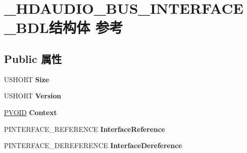 \hypertarget{struct___h_d_a_u_d_i_o___b_u_s___i_n_t_e_r_f_a_c_e___b_d_l}{}\section{\+\_\+\+H\+D\+A\+U\+D\+I\+O\+\_\+\+B\+U\+S\+\_\+\+I\+N\+T\+E\+R\+F\+A\+C\+E\+\_\+\+B\+D\+L结构体 参考}
\label{struct___h_d_a_u_d_i_o___b_u_s___i_n_t_e_r_f_a_c_e___b_d_l}
\subsection*{Public 属性}
\begin{DoxyCompactItemize}
\item 
\mbox{\label{struct___h_d_a_u_d_i_o___b_u_s___i_n_t_e_r_f_a_c_e___b_d_l_a1f72cb5ee8ed0588aee8e1c1cab9c82c}} 
U\+S\+H\+O\+RT {\bfseries Size}
\item 
\mbox{\label{struct___h_d_a_u_d_i_o___b_u_s___i_n_t_e_r_f_a_c_e___b_d_l_ac65043cf27b781c04b795db78a9beda2}} 
U\+S\+H\+O\+RT {\bfseries Version}
\item 
\mbox{\label{struct___h_d_a_u_d_i_o___b_u_s___i_n_t_e_r_f_a_c_e___b_d_l_a94973f2d2142e6372eb134040fd49f6a}} 
\hyperlink{interfacevoid}{P\+V\+O\+ID} {\bfseries Context}
\item 
\mbox{\label{struct___h_d_a_u_d_i_o___b_u_s___i_n_t_e_r_f_a_c_e___b_d_l_a110b7573dc3fa08666baddff612449d9}} 
P\+I\+N\+T\+E\+R\+F\+A\+C\+E\+\_\+\+R\+E\+F\+E\+R\+E\+N\+CE {\bfseries Interface\+Reference}
\item 
\mbox{\label{struct___h_d_a_u_d_i_o___b_u_s___i_n_t_e_r_f_a_c_e___b_d_l_a1e91f3c54a6514fac028672e6ccdba01}} 
P\+I\+N\+T\+E\+R\+F\+A\+C\+E\+\_\+\+D\+E\+R\+E\+F\+E\+R\+E\+N\+CE {\bfseries Interface\+Dereference}
\item 
\mbox{\label{struct___h_d_a_u_d_i_o___b_u_s___i_n_t_e_r_f_a_c_e___b_d_l_a1e0c4e8272946887ac8aa8e71002de56}} 

\end{DoxyCompactItemize}
